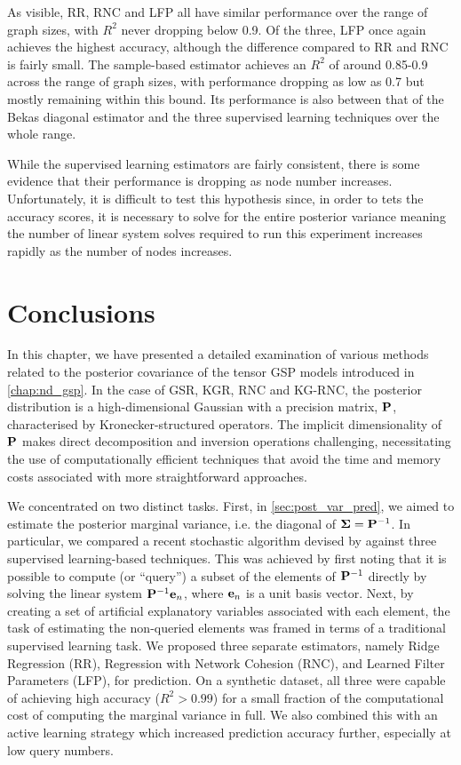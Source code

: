 As visible, RR, RNC and LFP all have similar performance over the range of graph sizes, with $R^2$ never dropping below 0.9. Of the three, LFP once again achieves the highest accuracy, although the difference compared to RR and RNC is fairly small. The sample-based estimator achieves an $R^2$ of around 0.85-0.9 across the range of graph sizes, with performance dropping as low as 0.7 but mostly remaining within this bound. Its performance is also between that of the Bekas diagonal estimator and the three supervised learning techniques over the whole range. 

While the supervised learning estimators are fairly consistent, there is some evidence that their performance is dropping as node number increases. Unfortunately, it is difficult to test this hypothesis since, in order to tets the accuracy scores, it is necessary to solve for the entire posterior variance meaning the number of linear system solves required to run this experiment increases rapidly as the number of nodes increases. 

\section{Conclusions}

In this chapter, we have presented a detailed examination of various methods related to the posterior covariance of the tensor GSP models introduced in \cref{chap:nd_gsp}. In the case of GSR, KGR, RNC and KG-RNC, the posterior distribution is a high-dimensional Gaussian with a precision matrix, $\mathbf{P}$, characterised by Kronecker-structured operators. The implicit dimensionality of $\mathbf{P}$ makes direct decomposition and inversion operations challenging, necessitating the use of computationally efficient techniques that avoid the time and memory costs associated with more straightforward approaches.

We concentrated on two distinct tasks. First, in \cref{sec:post_var_pred}, we aimed to estimate the posterior marginal variance, i.e. the diagonal of $\mathbf{\Sigma} = \mathbf{P}^{-1}$. In particular, we compared a recent stochastic algorithm devised by \cite{Bekas2007} against three supervised learning-based techniques. This was achieved by first noting that it is possible to compute (or ``query'') a subset of the elements of $\mathbf{P}^{-1}$ directly by solving the linear system $\mathbf{P}^{-1} \mathbf{e}_n$, where $\mathbf{e}_n$ is a unit basis vector. Next, by creating a set of artificial explanatory variables associated with each element, the task of estimating the non-queried elements was framed in terms of a traditional supervised learning task. We proposed three separate estimators, namely Ridge Regression (RR), Regression with Network Cohesion (RNC), and Learned Filter Parameters (LFP), for prediction. On a synthetic dataset, all three were capable of achieving high accuracy ($R^2 > 0.99$) for a small fraction of the computational cost of computing the marginal variance in full. We also combined this with an active learning strategy which increased prediction accuracy further, especially at low query numbers.  

